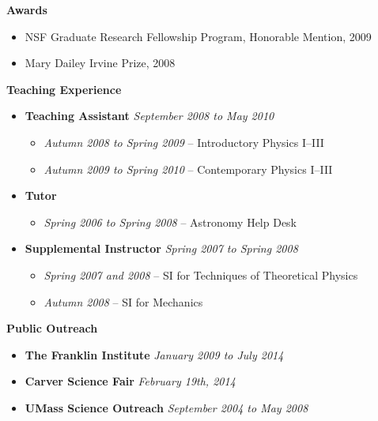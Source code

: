 \begin{vita}
{\large\bf Awards}
\begin{itemize} \itemsep -2pt
	\item NSF Graduate Research Fellowship Program, Honorable Mention, 2009
	\item Mary Dailey Irvine Prize, 2008
\end{itemize}

{\large\bf Teaching Experience}

\begin{itemize} \itemsep -2pt
	\item \textbf{Teaching Assistant} \hfill \textit{September 2008 to May 2010}
	\begin{itemize} \itemsep -2pt
		\item[] \textit{Autumn 2008 to Spring 2009} -- Introductory Physics I--III
		\item[]\textit{Autumn 2009 to Spring 2010} -- Contemporary Physics I--III
	\end{itemize}
	\item \textbf{Tutor}%
	\begin{itemize} \itemsep -2pt
		\item[]\textit{Spring 2006 to Spring 2008} -- Astronomy Help Desk
	\end{itemize}
	\item \textbf{Supplemental Instructor} \hfill \textit{Spring 2007  to Spring 2008}
	\begin{itemize} \itemsep -2pt
		\item[]\textit{Spring 2007 and 2008} -- SI for Techniques of Theoretical Physics
		\item[]\textit{Autumn 2008} -- SI for  Mechanics
	\end{itemize}
\end{itemize}

{\large\bf Public Outreach}
\begin{itemize} \itemsep -2pt
	\item \textbf{The Franklin Institute} \hfill \textit{January 2009 to July 2014}
	\item \textbf{Carver Science Fair} \hfill \textit{February 19th, 2014}
	\item \textbf{UMass Science Outreach} \hfill \textit{September 2004 to May 2008}
\end{itemize}

\end{vita}

